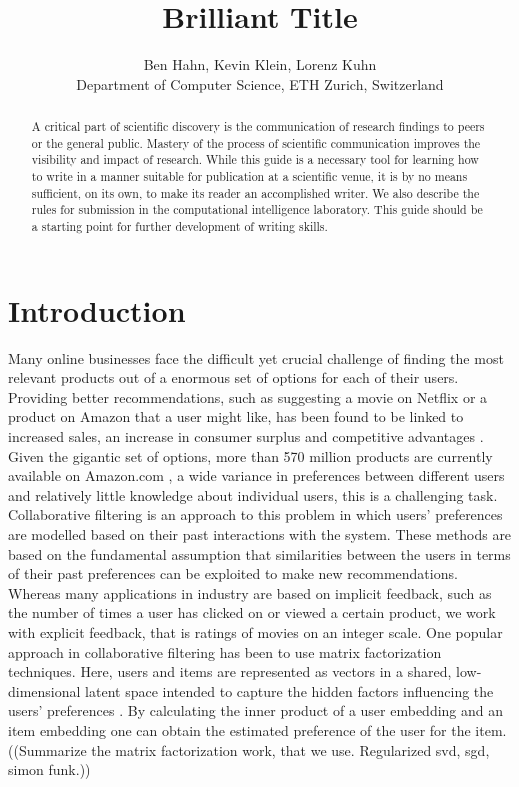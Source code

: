 \documentclass[10pt,conference,compsocconf]{IEEEtran}
\begin{document}
\title{Brilliant Title}

\author{
  Ben Hahn, Kevin Klein, Lorenz Kuhn\\
  Department of Computer Science, ETH Zurich, Switzerland
}

\maketitle

\begin{abstract}
  A critical part of scientific discovery is the
  communication of research findings to peers or the general public.
  Mastery of the process of scientific communication improves the
  visibility and impact of research. While this guide is a necessary
  tool for learning how to write in a manner suitable for publication
  at a scientific venue, it is by no means sufficient, on its own, to
  make its reader an accomplished writer. We also describe the rules
  for submission in the computational intelligence laboratory.
  This guide should be a
  starting point for further development of writing skills.
\end{abstract}

\section{Introduction}

Many online businesses face the difficult yet crucial challenge of finding the most relevant products out of a enormous set of options for each of their users. Providing better recommendations, such as suggesting a movie on Netflix or a product on Amazon that a user might like, has been found to be linked to increased sales, an increase in consumer surplus and competitive advantages \cite{hinz2010impact}.
Given the gigantic set of options, more than 570 million products are currently available on Amazon.com \cite{scrap2018}, a wide variance in preferences between different users and relatively little knowledge about individual users, this is a challenging task. Collaborative filtering \cite{sarwar2001item} is an approach to this problem in which users' preferences are modelled based on their past interactions with the system. These methods are based on the fundamental assumption that similarities between the users in terms of their past preferences can be exploited to make new recommendations. Whereas many applications in industry are based on implicit feedback, such as the number of times a user has clicked on or viewed a certain product, we work with explicit feedback, that is ratings of movies on an integer scale. 
One popular approach in collaborative filtering has been to use matrix factorization techniques. Here, users and items are represented as vectors in a shared, low-dimensional latent space intended to capture the hidden factors influencing the users' preferences \cite{koren2009matrix}. By calculating the inner product of a user embedding and an item embedding one can obtain the estimated preference of the user for the item. ((Summarize the matrix factorization work, that we use. Regularized svd, sgd, simon funk.))
\end{document}
